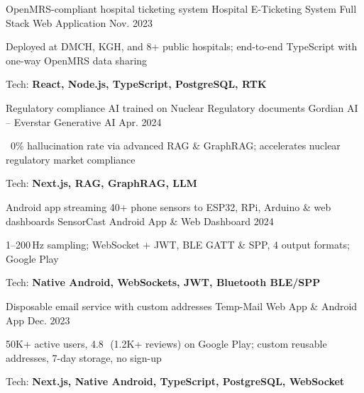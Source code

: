 

\begin{cventries}

  \cventry
    {OpenMRS-compliant hospital ticketing system\enskip\textbullet{}}
    {Hospital E-Ticketing System}
    {Full Stack Web Application}
    {Nov. 2023}
    {
      \begin{cvitems}
        \item {Deployed at DMCH, KGH, and 8+ public hospitals; end-to-end TypeScript with one-way OpenMRS data sharing}
        \item {Tech: \textbf{React, Node.js, TypeScript, PostgreSQL, RTK}}
      \end{cvitems}
    }

  \cventry
    {Regulatory compliance AI trained on Nuclear Regulatory documents\enskip\textbullet{}}
    {Gordian AI – Everstar}
    {Generative AI}
    {Apr. 2024}
    {
      \begin{cvitems}
        \item {~0\% hallucination rate via advanced RAG \& GraphRAG; accelerates nuclear regulatory market compliance}
        \item {Tech: \textbf{Next.js, RAG, GraphRAG, LLM}}
      \end{cvitems}
    }

  \cventry
    {Android app streaming 40+ phone sensors to ESP32, RPi, Arduino \& web dashboards\enskip\textbullet{}}
    {SensorCast}
    {Android App \& Web Dashboard}
    {2024}
    {
      \begin{cvitems}
        \item {1--200\,Hz sampling; WebSocket + JWT, BLE GATT \& SPP, 4 output formats; Google Play}
        \item {Tech: \textbf{Native Android, WebSockets, JWT, Bluetooth BLE/SPP}}
      \end{cvitems}
    }

  \cventry
    {Disposable email service with custom addresses\enskip\textbullet{}}
    {Temp-Mail}
    {Web App \& Android App}
    {Dec. 2023}
    {
      \begin{cvitems}
        \item {50K+ active users, 4.8\,\bigstar\ (1.2K+ reviews) on Google Play; custom reusable addresses, 7-day storage, no sign-up}
        \item {Tech: \textbf{Next.js, Native Android, TypeScript, PostgreSQL, WebSocket}}
      \end{cvitems}
    }


\end{cventries}

